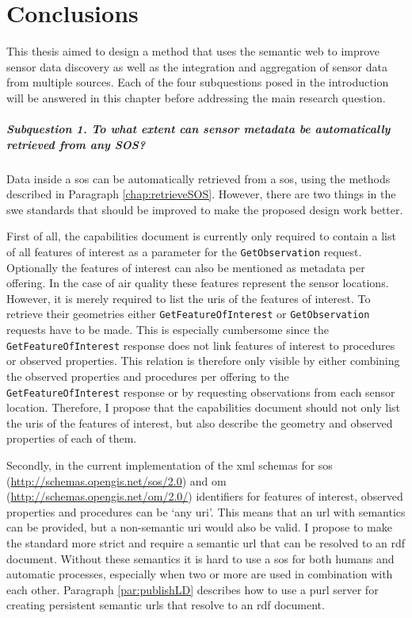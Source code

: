 
\chapter{Conclusions}
\label{chap:conclusion}

This thesis aimed to design a method that uses the semantic web to improve sensor data discovery as well as the integration and aggregation of sensor data from multiple sources. Each of the four subquestions posed in the introduction will be answered in this chapter before addressing the main research question.

\paragraph{\textbf{Subquestion 1.} To what extent can sensor metadata be automatically retrieved from any SOS?}\mbox{}

Data inside a \acl{sos} can be automatically retrieved from a \ac{sos}, using the methods described in Paragraph \ref{chap:retrieveSOS}. However, there are two things in the \ac{swe} standards that should be improved to make the proposed design work better. 

First of all, the capabilities document is currently only required to contain a list of all features of interest as a parameter for the \texttt{GetObservation} request. Optionally the features of interest can also be mentioned as metadata per offering. In the case of air quality these features represent the sensor locations. However, it is merely required to list the \acp{uri} of the features of interest. To retrieve their geometries either \texttt{GetFeatureOfInterest} or \texttt{GetObservation} requests have to be made. This is especially cumbersome since the \texttt{GetFeatureOfInterest} response does not link features of interest to procedures or observed properties. This relation is therefore only visible by either combining the observed properties and procedures per offering to the \texttt{GetFeatureOfInterest} response or by requesting observations from each sensor location. Therefore, I propose that the capabilities document should not only list the \acp{uri} of the features of interest, but also describe the geometry and observed properties of each of them. 

Secondly, in the current implementation of the \ac{xml} schemas for \ac{sos} (\url{http://schemas.opengis.net/sos/2.0}) and \ac{om} (\url{http://schemas.opengis.net/om/2.0/}) identifiers for features of interest, observed properties and procedures can be `any \ac{uri}'. This means that an \ac{url} with semantics can be provided, but a non-semantic \ac{uri} would also be valid. I propose to make the standard more strict and require a semantic \ac{url} that can be resolved to an \ac{rdf} document. Without these semantics it is hard to use a \ac{sos} for both humans and automatic processes, especially when two or more are used in combination with each other. Paragraph \ref{par:publishLD} describes how to use a \ac{purl} server for creating persistent semantic \acp{url} that resolve to an \ac{rdf} document. 

